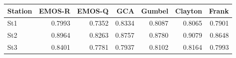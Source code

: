 \begin{table}[ht]
\centering
\begin{tabular}{lrrrrrr}
  \hline
Station & EMOS-R & EMOS-Q & GCA & Gumbel & Clayton & Frank \\ 
  \hline
St1 & 0.7993 & 0.7352 & 0.8334 & 0.8087 & 0.8065 & 0.7901 \\ 
  St2 & 0.8964 & 0.8263 & 0.8757 & 0.8780 & 0.9079 & 0.8648 \\ 
  St3 & 0.8401 & 0.7781 & 0.7937 & 0.8102 & 0.8164 & 0.7993 \\ 
   \hline
\end{tabular}
\end{table}
